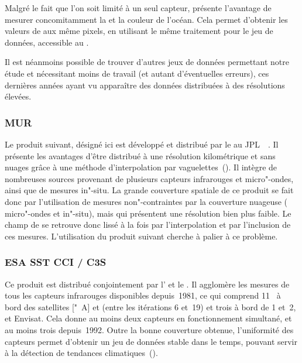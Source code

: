 Malgré le fait que l'on soit limité à un seul capteur,  présente l'avantage de mesurer concomitamment la  et la couleur de l'océan.
Cela permet d'obtenir les valeurs de  aux même pixels, en utilisant le même traitement pour le jeu de données, accessible au .

Il est néanmoins possible de trouver d'autres jeux de données permettant notre étude et nécessitant moins de travail (et autant d'éventuelles erreurs), ces dernières années ayant vu apparaître des données distribuées à des résolutions élevées.

\subsubsection{MUR}

Le produit suivant, désigné ici  est développé et distribué par le  au JPL~~.
Il présente les avantages d'être distribué à une résolution kilométrique et sans nuages grâce à une méthode d'interpolation par vaguelettes~(\cite{chin_2017}).
Il intègre de nombreuses sources provenant de plusieurs capteurs infrarouges et micro"-ondes, ainsi que de mesures in"-situ.
La grande couverture spatiale de ce produit se fait donc par l'utilisation de mesures non"-contraintes par la couverture nuageuse ( micro"-ondes et in"-situ), mais qui présentent une résolution bien plus faible.
Le champ de  se retrouve donc lissé à la fois par l'interpolation et par l'inclusion de ces mesures.
L'utilisation du produit suivant cherche à palier à ce problème.

\subsubsection{ESA SST CCI / C3S}

Ce produit est distribué conjointement par l'   et le .
Il agglomère les mesures de tous les capteurs infrarouges disponibles depuis~1981, ce qui comprend 11~ à bord des satellites ["~A] et  (entre les itérations 6 et~19) et trois  à bord de  1 et~2, et Envisat.
Cela donne au moins deux capteurs en fonctionnement simultané, et au moins trois depuis~1992.
Outre la bonne couverture obtenue, l'uniformité des capteurs permet d'obtenir un jeu de données stable dans le temps, pouvant servir à la détection de tendances climatiques~(\cite{merchant_2019}).


